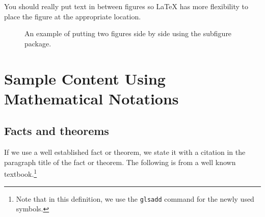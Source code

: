\documentclass[msc,oneside]{ubcthesis}%
\begin{document}
You should really put text in between figures so LaTeX has more flexibility to place the figure at the appropriate location.

\begin{figure}
	\centering


	\caption{An example of putting two figures side by side using the subfigure package.}
	\label{ref:ex-ppa-l1-linf}
\end{figure}

\chapter{Sample Content Using Mathematical Notations}

\section{Facts and theorems}
If we use a well established fact or theorem, we state it with a citation in the paragraph title of the fact or theorem. The following is from a well known textbook.\footnote{Note that in this definition, we use the \texttt{glsadd} command for the newly used symbols.}
\end{document}
